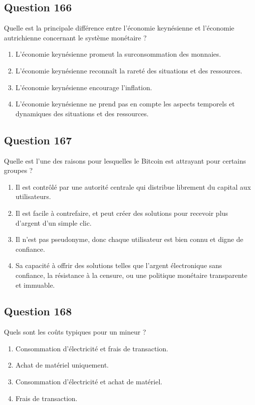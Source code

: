 \documentclass[12pt,a4paper]{article}
\begin{document}
\bigskip


\subsection*{Question 166}
Quelle est la principale différence entre l'économie keynésienne et l'économie autrichienne concernant le système monétaire ?

\begin{enumerate}[label=\Alph*., leftmargin=*]
\item L'économie keynésienne promeut la surconsommation des monnaies.
\item L'économie keynésienne reconnaît la rareté des situations et des ressources.
\item L'économie keynésienne encourage l'inflation.
\item L'économie keynésienne ne prend pas en compte les aspects temporels et dynamiques des situations et des ressources.
\end{enumerate}

\bigskip


\subsection*{Question 167}
Quelle est l'une des raisons pour lesquelles le Bitcoin est attrayant pour certains groupes ?

\begin{enumerate}[label=\Alph*., leftmargin=*]
\item Il est contrôlé par une autorité centrale qui distribue librement du capital aux utilisateurs.
\item Il est facile à contrefaire, et peut créer des solutions pour recevoir plus d'argent d'un simple clic.
\item Il n'est pas pseudonyme, donc chaque utilisateur est bien connu et digne de confiance.
\item Sa capacité à offrir des solutions telles que l'argent électronique sans confiance, la résistance à la censure, ou une politique monétaire transparente et immuable.
\end{enumerate}

\bigskip


\subsection*{Question 168}
Quels sont les coûts typiques pour un mineur ?

\begin{enumerate}[label=\Alph*., leftmargin=*]
\item Consommation d'électricité et frais de transaction.
\item Achat de matériel uniquement.
\item Consommation d'électricité et achat de matériel.
\item Frais de transaction.
\end{enumerate}
\end{document}
